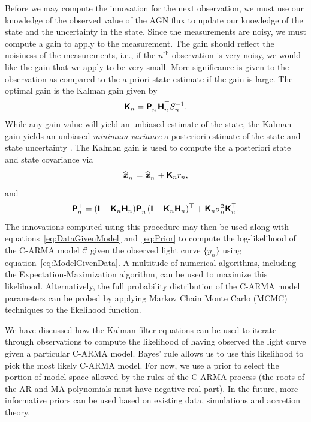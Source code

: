 \documentclass[a4paper,fleqn,usenatbib]{mnras}
\begin{document}
Before we may compute the innovation for the next observation, we must use our knowledge of the observed value of the AGN flux to update our knowledge of the state and the uncertainty in the state. Since the measurements are noisy, we must compute a gain to apply to the measurement. The gain should reflect the noisiness of the measurements, i.e., if the $n^{\mathrm{th}}$-observation is very noisy, we would like the gain that we apply to be very small. More significance is given to the observation as compared to the a priori state estimate if the gain is large. The optimal gain is the Kalman gain given by
\begin{equation}\label{eq:KalmanGain}
\textbf{\textsf{K}}_{n} = \textbf{\textsf{P}}^{-}_{n} \textbf{\textsf{H}}_{n}^{\top} S_{n}^{-1}.
\end{equation}
While any gain value will yield an unbiased estimate of the state, the Kalman gain yields an unbiased \textit{minimum variance} a posteriori estimate of the state and state uncertainty \citep[chapter 3.3]{Simon}. The Kalman gain is used to compute the a posteriori state and state covariance via
\begin{equation}\label{eq:APosterioriState}
\widehat{\textbf{\textit{x}}}^{+}_{n} = \widehat{\textbf{\textit{x}}}^{-}_{n} + \textbf{\textsf{K}}_{n} r_{n},
\end{equation}
and
\begin{equation}\label{eq:APosterioriUncertainty}
\textbf{\textsf{P}}^{+}_{n} = (\textbf{\textsf{I}} - \textbf{\textsf{K}}_{n} \textbf{\textsf{H}}_{n}) \textbf{\textsf{P}}^{-}_{n} (\textbf{\textsf{I}} - \textbf{\textsf{K}} _{n} \textbf{\textsf{H}}_{n})^{\top} + \textbf{\textsf{K}}_{n} \sigma^{2}_{n} \textbf{\textsf{K}}_{n}^{\top}.
\end{equation}
The innovations computed using this procedure may then be used along with equations~\eqref{eq:DataGivenModel} and~\eqref{eq:Prior} to compute the log-likelihood of the C-ARMA model $\mathcal{C}$ given the observed light curve $\{y_{n}\}$ using equation~\eqref{eq:ModelGivenData}. A multitude of numerical algorithms, including the Expectation-Maximization algorithm, can be used to maximize this likelihood. Alternatively, the full probability distribution of the C-ARMA model parameters can be probed by applying Markov Chain Monte Carlo (MCMC) techniques to the likelihood function.

We have discussed how the Kalman filter equations can be used to iterate through observations to compute the likelihood of having observed the light curve given a particular C-ARMA model. Bayes' rule allows us to use this likelihood to pick the most likely C-ARMA model. For now, we use a prior to select the portion of model space allowed by the rules of the C-ARMA process (the roots of the AR and MA polynomials must have negative real part). In the future, more informative priors can be used based on existing data, simulations and accretion theory.
\end{document}
